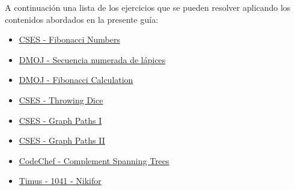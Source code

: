 A continuación una lista de los ejercicios que se pueden resolver aplicando los contenidos abordados en la presente guía:

\begin{itemize}
	\item \href{https://cses.fi/problemset/task/1722}{CSES - Fibonacci Numbers}
	\item \href{https://dmoj.uclv.edu.cu/problem/secnum}{DMOJ - Secuencia numerada de lápices}
	\item \href{https://dmoj.uclv.edu.cu/problem/fibonaccicalculatio}{DMOJ - Fibonacci Calculation}
	\item \href{https://cses.fi/problemset/task/1096/}{CSES - Throwing Dice}
	\item \href{https://cses.fi/problemset/task/1723/}{CSES - Graph Paths I}
	\item \href{https://cses.fi/problemset/task/1724/}{CSES - Graph Paths II}
	\item \href{https://www.codechef.com/problems/CSTREE}{CodeChef - Complement Spanning Trees}
	\item \href{https://acm.timus.ru/problem.aspx?space=1&num=1041}{Timus - 1041 - Nikifor}
\end{itemize}
